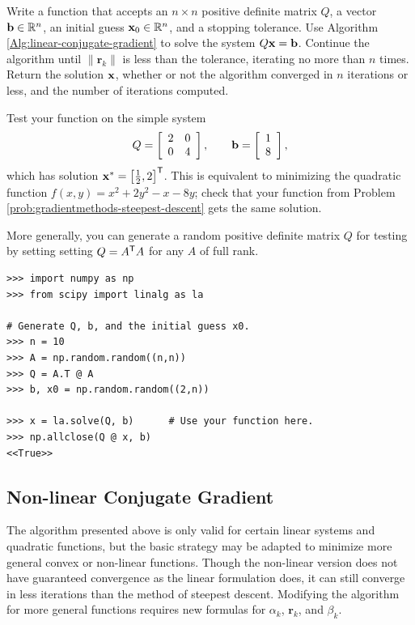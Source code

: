 \begin{problem} %
Write a function that accepts an $n \times n$ positive definite matrix $Q$, a vector $\mathbf{b}\in\mathbb{R}^n$, an initial guess $\mathbf{x}_0\in\mathbb{R}^n$, and a stopping tolerance.
Use Algorithm \ref{Alg:linear-conjugate-gradient} to solve the system $Q\mathbf{x} = \mathbf{b}$.
Continue the algorithm until $\|\mathbf{r}_k\|$ is less than the tolerance, iterating no more than $n$ times.
Return the solution $\mathbf{x}$, whether or not the algorithm converged in $n$ iterations or less, and the number of iterations computed.

Test your function on the simple system
\[
Q = \left[\begin{array}{cc}2 & 0 \\ 0 & 4\end{array}\right],
\qquad
\mathbf{b} = \left[\begin{array}{c}1 \\ 8\end{array}\right],
\]
which has solution $\mathbf{x}^* = \left[\frac{1}{2}, 2\right]^{\mathsf T}$.
This is equivalent to minimizing the quadratic function $f(x,y) = x^2 + 2y^2 - x - 8y$; check that your function from Problem \ref{prob:gradientmethods-steepest-descent} gets the same solution.

More generally, you can generate a random positive definite matrix $Q$ for testing by setting setting $Q = A^{\mathsf T} A$ for any $A$ of full rank.
\begin{lstlisting}
>>> import numpy as np
>>> from scipy import linalg as la

# Generate Q, b, and the initial guess x0.
>>> n = 10
>>> A = np.random.random((n,n))
>>> Q = A.T @ A
>>> b, x0 = np.random.random((2,n))

>>> x = la.solve(Q, b)      # Use your function here.
>>> np.allclose(Q @ x, b)
<<True>>
\end{lstlisting}
\label{prob:gradientmethods-linear-cg}
\end{problem}

\subsection*{Non-linear Conjugate Gradient}
The algorithm presented above is only valid for certain linear systems and quadratic functions, but the basic strategy may be adapted to minimize more general convex or non-linear functions.
Though the non-linear version does not have guaranteed convergence as the linear formulation does, it can still converge in less iterations than the method of steepest descent.
Modifying the algorithm for more general functions requires new formulas for $\alpha_k$, $\mathbf{r}_k$, and $\beta_k$.

